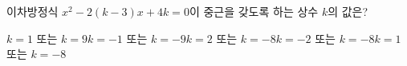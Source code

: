 이차방정식 $x^2-2(k-3)x+4k=0$이 중근을 갖도록 하는 상수 $k$의 값은?
\begin{choicesii}{$k=1$ 또는 $k=9$}{$k=-1$ 또는 $k=-9$}{$k=2$ 또는 $k=-8$}{$k=-2$ 또는 $k=-8$}{$k=1$ 또는 $k=-8$}\end{choicesii}
